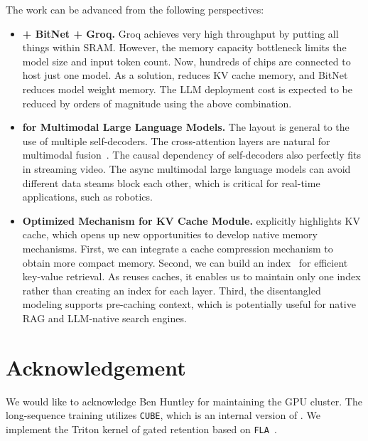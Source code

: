 The work can be advanced from the following perspectives:
\begin{itemize}[leftmargin=*]
\setlength\itemsep{0.01em}
\item \textbf{\our{} + BitNet + Groq.} Groq achieves very high throughput by putting all things within SRAM. However, the memory capacity bottleneck limits the model size and input token count. Now, hundreds of chips are connected to host just one model. As a solution, \our{} reduces KV cache memory, and BitNet reduces model weight memory. The LLM deployment cost is expected to be reduced by orders of magnitude using the above combination.
\item \textbf{\our{} for Multimodal Large Language Models.} The \our{} layout is general to the use of multiple self-decoders. The cross-attention layers are natural for multimodal fusion~\cite{vlmo,beit3}. The causal dependency of self-decoders also perfectly fits in streaming video. The async multimodal large language models can avoid different data steams block each other, which is critical for real-time applications, such as robotics.
\item \textbf{Optimized Mechanism for KV Cache Module.}  explicitly highlights KV cache, which opens up new opportunities to develop native memory mechanisms.
First, we can integrate a cache compression mechanism to obtain more compact memory. Second, we can build an index~\cite{longmem} for efficient key-value retrieval. As \our{} reuses caches, it enables us to maintain only one index rather than creating an index for each layer. Third, the disentangled modeling supports pre-caching context, which is potentially useful for native RAG and LLM-native search engines.
\end{itemize}

\section*{Acknowledgement}

We would like to acknowledge Ben Huntley for maintaining the GPU cluster.
The long-sequence training utilizes \texttt{CUBE}, which is an internal version of \cite{cube}.
We implement the Triton kernel of gated retention based on \texttt{FLA}~\cite{fla}.

\newpage

